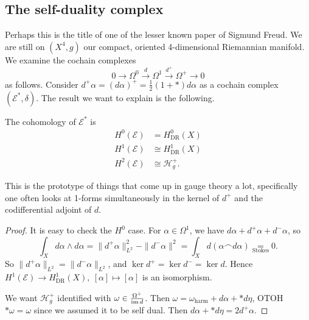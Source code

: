 \subsection{The self-duality complex}
Perhaps this is the title of one of the lesser known paper of Sigmund Freud. We are still on $(X^4, g)$ our compact, oriented 4-dimensional Riemannian manifold. We examine the cochain complexes 
\[
0 \to \Omega^0 \xrightarrow d\Omega^1 \xrightarrow{d^+} \Omega^+ \to 0
\] as follows. Consider $d^+ \alpha  = (d\alpha )^+ = \frac{1}{2}(1 +*)d\alpha $ as a cochain complex $\left( \mathcal E^*, \delta \right) $. The result we want to explain is the following.
\begin{theorem}
    The cohomology of $\mathcal E^*$ is 
    \begin{align*}
        H^0(\mathcal E) &= H^0 _{\mathrm{DR}}(X)\\
        H^1(\mathcal E) &\cong  H^1 _{\mathrm{DR}}(X)\\
        H^2(\mathcal E) &\cong \mathcal H^+ _g.
    \end{align*}
\end{theorem}
This is the prototype of things that come up in gauge theory a lot, specifically one often looks at 1-forms simultaneously in the kernel of $d^+$ and the codifferential adjoint of $d$.
\begin{proof}
    It is easy to check the $H^0$ case. For $\alpha  \in \Omega^1$, we have $d\alpha  + d^+ \alpha  + d^- \alpha $, so \[
        \int_X d\alpha  \wedge d\alpha  = \| d^+ \alpha \|^2_{L^2}- \| d^- \alpha \|^2 = \int_X d(\alpha  \frown d\alpha ) \underset{\text{Stokes}}{=} 0.
    \]  So $\| d^+ \alpha \|_{L^2}= \| d^- \alpha \|_{L^2}$, and $\ker d^+ = \ker d^- = \ker d$. Hence $H^1(\mathcal E) \to H^1 _{\mathrm{DR}}(X), \ [\alpha ]\mapsto  [\alpha ]$ is an isomorphism.

    We want $\mathcal H^+_g$ identified with $\omega \in \frac{\Omega^+}{\operatorname{im} d}$. Then $\omega = \omega _{\text{harm} }+ d\alpha  + * d\eta$, OTOH $*\omega = \omega$ since we assumed it to be self dual. Then $d\alpha  + *d \eta = 2d^+ \alpha $.
\end{proof}


